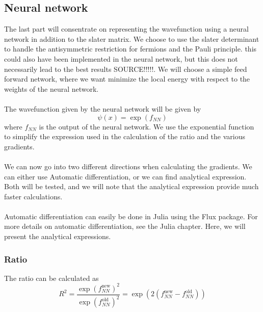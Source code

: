 \subsection{Neural network}
The last part will consentrate on representing the wavefunction using a neural network in addition to the slater matrix. We choose to use the slater determinant to handle the antisymmetric restriction for fermions and the Pauli principle. this could also have been implemented in the neural network, but this does not necessarily lead to the best results SOURCE!!!!!. 
We will choose a simple feed forward network, where we want minimize the local energy with respect to the weights of the neural network.
\\
\\
The wavefunction given by the neural network will be given by
\begin{equation}
    \psi(x) = \exp(f_{NN}) 
\end{equation}
where $f_{NN}$ is the output of the neural network. We use the exponential function to simplify the expression used in the calculation of the ratio and the various gradients. 
\\
\\
We can now go into two different directions when calculating the gradients. We can either use Automatic differentiation, or we can find analytical expression. Both will be tested, and we will note that the analytical expression provide much faster calculations. 
\\
\\
Automatic differentiation can easily be done in Julia using the Flux package. For more details on automatic differentiation, see the Julia chapter. Here, we will present the analytical expressions. 
\subsubsection{Ratio}
The ratio can be calculated as 
\begin{equation}
    R^2 = \frac{\exp(f_{NN}^\text{new})^2}{\exp(f_{NN}^\text{old})^2} = \exp(2(f_{NN}^\text{new} - f_{NN}^\text{old}))
\end{equation}
